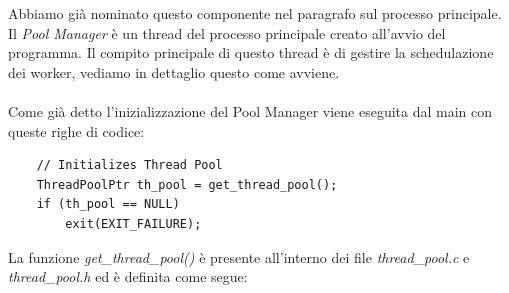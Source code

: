 \documentclass[italian]{tktltiki2}
\begin{document}
Abbiamo già nominato questo componente nel paragrafo sul processo principale. Il \emph{Pool Manager} è un thread del processo principale creato all'avvio del programma. Il compito principale di questo thread è di gestire la schedulazione dei worker, vediamo in dettaglio questo come avviene.\\\\ Come già detto l'inizializzazione del Pool Manager viene eseguita dal main con queste righe di codice:
\begin{lstlisting}
    // Initializes Thread Pool
    ThreadPoolPtr th_pool = get_thread_pool();
    if (th_pool == NULL)
        exit(EXIT_FAILURE);
\end{lstlisting}
La funzione \emph{get\_thread\_pool()} è presente all'interno dei file \emph{thread\_pool.c} e \emph{thread\_pool.h} ed è definita come segue:
\end{document}
